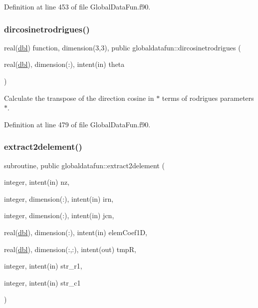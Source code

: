 Definition at line 453 of file Global\+Data\+Fun.\+f90.

\mbox{\label{namespaceglobaldatafun_a79e0439ba9c19e8c9bd28d76417cc4db}} 
\subsubsection{\texorpdfstring{dircosinetrodrigues()}{dircosinetrodrigues()}}
{\footnotesize\ttfamily real(\hyperlink{namespaceglobaldatafun_a5008801201dd34f2af8eae07756befb4}{dbl}) function, dimension(3,3), public globaldatafun\+::dircosinetrodrigues (\begin{DoxyParamCaption}\item[{real(\hyperlink{namespaceglobaldatafun_a5008801201dd34f2af8eae07756befb4}{dbl}), dimension(\+:), intent(in)}]{theta }\end{DoxyParamCaption})}



Calculate the transpose of the direction cosine in $\ast$ terms of rodrigues parameters $\ast$. 



Definition at line 479 of file Global\+Data\+Fun.\+f90.

\mbox{\label{namespaceglobaldatafun_a8068755a2ac0857cf1dfc681e43af3a8}} 
\subsubsection{\texorpdfstring{extract2delement()}{extract2delement()}}
{\footnotesize\ttfamily subroutine, public globaldatafun\+::extract2delement (\begin{DoxyParamCaption}\item[{integer, intent(in)}]{nz,  }\item[{integer, dimension(\+:), intent(in)}]{irn,  }\item[{integer, dimension(\+:), intent(in)}]{jcn,  }\item[{real(\hyperlink{namespaceglobaldatafun_a5008801201dd34f2af8eae07756befb4}{dbl}), dimension(\+:), intent(in)}]{elem\+Coef1D,  }\item[{real(\hyperlink{namespaceglobaldatafun_a5008801201dd34f2af8eae07756befb4}{dbl}), dimension(\+:,\+:), intent(out)}]{tmpR,  }\item[{integer, intent(in)}]{str\+\_\+r1,  }\item[{integer, intent(in)}]{str\+\_\+c1 }\end{DoxyParamCaption})}



